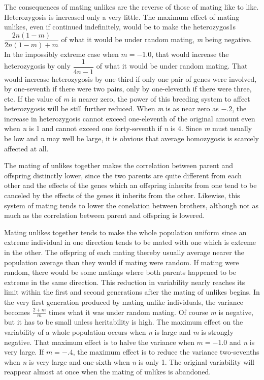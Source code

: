 The consequences of mating unlikes are the reverse of those of mating
like to like. Heterozygosis is increased only a very little. The maximum
effect of mating unlikes, even if continued indefinitely, would be
to make the heterozygos1s $\dfrac{2n(1 - m)}{2n(1 - m) + m}$ of what it
would be under random mating, \textit{m} being negative. In the impossibly
extreme case when $m = -1.0$, that would increase the heterozygosis by only
$\dfrac{1}{4n - 1}$ of what it would be under random mating. That would
increase heterozygosis by one-third if only one pair of genes were involved,
by one-seventh if there were two pairs, only by one-eleventh if there were
three, etc. If the value of \textit{m} is nearer zero, the power of this
breeding system to affect heterozygosis will be still further reduced. When
\textit{m} is as near zero as $-.2$, the increase in heterozygosis cannot
exceed one-eleventh of the original amount even when \textit{n} is 1 and
cannot exceed one forty-seventh if \textit{n} is 4. Since \textit{m} must
usually be low and \textit{n} may well be large, it is obvious that average
homozygosis is scarcely affected at all.

The mating of unlikes together makes the correlation between parent
and offspring distinctly lower, since the two parents are quite different
from each other and the effects of the genes which an offspring
inherits from one tend to be canceled by the effects of the genes it inherits
from the other. Likewise, this system of mating tends to lower the
conelation between brothers, although not as much as the correlation
between parent and offspring is lowered.

Mating unlikes together tends to make the whole population uniform since an
extreme individual in one direction tends to be mated with one which is extreme
in the other. The offspring of each mating thereby usually average nearer the
population average than they would if mating were random. If mating were random,
there would be some matings where both parents happened to be extreme in the
same direction. This reduction in variability nearly reaches its limit within
the first and second generations after the mating of unlikes begins. In the very
first generation produced by mating unlike individuals, the variance becomes
$\frac{2 + m}{m}$ times what it was under random mating. Of course \textit{m}
is negative, but it has to be small unless heritability is high. The maximum
effect on the variability of a whole population occurs when \textit{n} is large
and \textit{m} is strongly negative. That maximum effect is to halve the variance
when $m = -1.0$ and \textit{n} is very large. If $m = -.4$, the maximum effect
is to reduce the variance two-sevenths when \textit{n} is very large and
one-sixth when \textit{n} is only 1. The original variability will reappear
almost at once when the mating of unlikes is abandoned.

